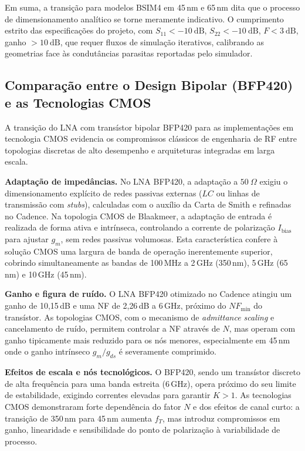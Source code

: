 Em suma, a transição para modelos BSIM4 em 45\,nm e 65\,nm dita que o processo de dimensionamento
analítico se torne meramente indicativo. O cumprimento estrito das especificações do projeto, com
$S_{11} < -10~\text{dB}$, $S_{22} < -10~\text{dB}$, $F < 3~\text{dB}$, ganho $> 10~\text{dB}$, que 
requer fluxos de simulação iterativos, calibrando as geometrias face às condutâncias parasitas
reportadas pelo simulador.

\subsection{Comparação entre o Design Bipolar (BFP420) e as Tecnologias CMOS}
\label{sub:comparacao_bipolar_cmos}

A transição do LNA com transístor bipolar BFP420 para as implementações em tecnologia CMOS evidencia
os compromissos clássicos de engenharia de RF entre topologias discretas de alto desempenho e
arquiteturas integradas em larga escala.

\textbf{Adaptação de impedâncias.} No LNA BFP420, a adaptação a $50~\Omega$ exigiu o dimensionamento
explícito de redes passivas externas ($LC$ ou linhas de transmissão com \textit{stubs}), calculadas
com o auxílio da Carta de Smith e refinadas no Cadence. Na topologia CMOS de Blaakmeer, a adaptação
de entrada é realizada de forma ativa e intrínseca, controlando a corrente de polarização $I_{\text{bias}}$
para ajustar $g_m$, sem redes passivas volumosas. Esta característica confere à solução CMOS uma
largura de banda de operação inerentemente superior, cobrindo simultaneamente as bandas de 100\,MHz a
2\,GHz (350\,nm), 5\,GHz (65\,nm) e 10\,GHz (45\,nm).

\textbf{Ganho e figura de ruído.} O LNA BFP420 otimizado no Cadence atingiu um ganho de 10{,}15\,dB
e uma NF de 2{,}26\,dB a 6\,GHz, próximo do $NF_{\text{min}}$ do transístor. As topologias CMOS,
com o mecanismo de \textit{admittance scaling} e cancelamento de ruído, permitem controlar a NF
através de $N$, mas operam com ganho tipicamente mais reduzido para os nós menores, especialmente em
45\,nm onde o ganho intrínseco $g_m/g_{ds}$ é severamente comprimido.

\textbf{Efeitos de escala e nós tecnológicos.} O BFP420, sendo um transístor discreto de alta
frequência para uma banda estreita (6\,GHz), opera próximo do seu limite de estabilidade, exigindo
correntes elevadas para garantir $K > 1$. As tecnologias CMOS demonstraram forte dependência do fator
$N$ e dos efeitos de canal curto: a transição de 350\,nm para 45\,nm aumenta $f_T$, mas introduz
compromissos em ganho, linearidade e sensibilidade do ponto de polarização à variabilidade de processo.

